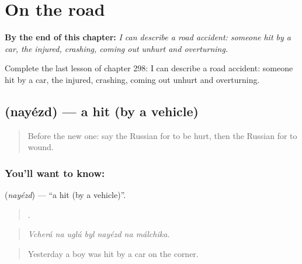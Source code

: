 
\chapter{On the road}
\label{ch:ru-on-the-road}

\begin{chapteropening}
\textbf{By the end of this chapter:} \emph{I can describe a road accident: someone hit by a car, the injured, crashing, coming out unhurt and overturning.}

Complete the last lesson of chapter 298: I can describe a road accident: someone hit by a car, the injured, crashing, coming out unhurt and overturning.
\end{chapteropening}

\section[\texorpdfstring{\ru{наезд} (nayézd)}{наезд (nayézd)}]{ (nayézd) — a hit (by a vehicle)}

\label{lesson:RU-C298-nayezd}



\begin{quote}
Before the new one: say the Russian for to be hurt, then the Russian for to wound.
\end{quote}

\subsection*{You'll want to know: }
\textbf{} (\emph{nayézd}) — \textquotedblleft{}a hit (by a vehicle)\textquotedblright{}.

\begin{quote}
      .
\end{quote}

\begin{quote}
\emph{Vcherá na uglú byl nayézd na málchika.}
\end{quote}

\begin{quote}
Yesterday a boy was hit by a car on the corner.
\end{quote}

